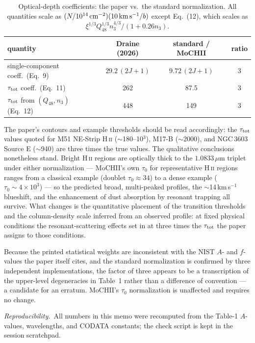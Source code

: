\documentclass[english,a4paper]{my_memo}
\newcommand{\HII}{H\,\textsc{ii}}
\newcommand{\tautot}{\tau_{\rm tot}}
\begin{document}
\begin{table}[h]
\centering
\caption{Optical-depth coefficients: the paper vs.\ the standard
normalization.  All quantities scale as $(N/10^{14}\,{\rm cm^{-2}})
(10\,{\rm km\,s^{-1}}/b)$ except Eq.~(12), which scales as
$\xi^{1/3} Q_{48}^{1/3} n_3^{4/3}/(1+0.26 n_3)$.}
\label{tab:tau}
\begin{tabular}{lccc}
\toprule
quantity & Draine (2026) & standard / MoCHII & ratio \\
\midrule
single-component coeff.\ (Eq.~9)      & $29.2\,(2J{+}1)$ & $9.72\,(2J{+}1)$ & 3 \\
$\tautot$ coeff.\ (Eq.~11)            & 262   & 87.5 & 3 \\
$\tautot$ from $(Q_{48}, n_3)$ (Eq.~12) & 448 & 149  & 3 \\
\bottomrule
\end{tabular}
\end{table}

The paper's contours and example thresholds should be read accordingly:
the $\tautot$ values quoted for M51 NE-Strip \HII{} ($\sim$180--10$^3$),
M17-B ($\sim$2000), and NGC\,3603 Source E ($\sim$940) are three times the
true values.  The qualitative conclusions nonetheless stand.  Bright \HII{}
regions are optically thick to the $1.0833\,\mu$m triplet under either
normalization --- MoCHII's own $\tau_0$ for representative \HII{} regions
ranges from a classical example (doublet $\tau_0 \approx 34$) to a dense
example ($\tau_0 \sim 4\times10^3$) --- so the predicted broad,
multi-peaked profiles, the $\sim$14\,km\,s$^{-1}$ blueshift, and the
enhancement of dust absorption by resonant trapping all survive.  What
changes is the quantitative placement of the transition thresholds and the
column-density scale inferred from an observed profile: at fixed physical
conditions the resonant-scattering effects set in at three times the
$\tautot$ the paper assigns to those conditions.

Because the printed statistical weights are inconsistent with the NIST
$A$- and $f$-values the paper itself cites, and the standard normalization
is confirmed by three independent implementations, the factor of three
appears to be a transcription of the upper-level degeneracies in Table~1
rather than a difference of convention --- a candidate for an erratum.
MoCHII's $\tau_0$ normalization is unaffected and requires no change.

\vspace{6pt}
\noindent\emph{Reproducibility.}\ All numbers in this memo were recomputed
from the Table-1 $A$-values, wavelengths, and CODATA constants; the check
script is kept in the session scratchpad.
\end{document}
